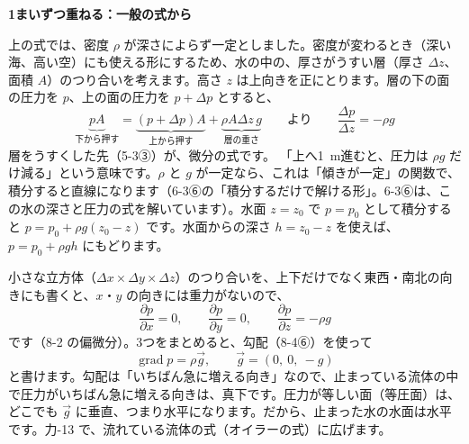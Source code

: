 \noindent\textbf{1まいずつ重ねる：一般の式から}\par\nobreak
上の式では、密度 $\rho$ が深さによらず一定としました。密度が変わるとき（深い海、高い空）にも使える形にするため、水の中の、厚さがうすい層（厚さ $\Delta z$、面積 $A$）のつり合いを考えます。高さ $z$ は上向きを正にとります。層の下の面の圧力を $p$、上の面の圧力を $p+\Delta p$ とすると、
\[ \underbrace{pA}_{\text{下から押す}}=\underbrace{(p+\Delta p)A}_{\text{上から押す}}+\underbrace{\rho A\Delta z\,g}_{\text{層の重さ}}\qquad\text{より}\qquad \frac{\Delta p}{\Delta z}=-\rho g \]
層をうすくした先（5-3③）が、微分の式です。
「上へ\qty{1}{m}進むと、圧力は $\rho g$ だけ減る」という意味です。$\rho$ と $g$ が一定なら、これは「傾きが一定」の関数で、積分すると直線になります（6-3⑥の「積分するだけで解ける形」。6-3⑥は、この水の深さと圧力の式を解いています）。水面 $z=z_0$ で $p=p_0$ として積分すると $p=p_0+\rho g(z_0-z)$ です。水面からの深さ $h=z_0-z$ を使えば、$p=p_0+\rho gh$ にもどります。
\begin{phflow}
\end{phflow}


\begin{motto}[5]
小さな立方体（$\Delta x\times\Delta y\times\Delta z$）のつり合いを、上下だけでなく東西・南北の向きにも書くと、$x$・$y$ の向きには重力がないので、
\[ \dfrac{\partial p}{\partial x}=0,\qquad \dfrac{\partial p}{\partial y}=0,\qquad \dfrac{\partial p}{\partial z}=-\rho g \]
です（8-2 の偏微分）。3つをまとめると、勾配（8-4⑥）を使って
\[ \operatorname{grad}p=\rho\vec{g},\qquad \vec{g}=(0,\ 0,\ -g) \]
と書けます。勾配は「いちばん急に増える向き」なので、止まっている流体の中で圧力がいちばん急に増える向きは、真下です。圧力が等しい面（等圧面）は、どこでも $\vec{g}$ に垂直、つまり水平になります。だから、止まった水の水面は水平です。力-13 で、流れている流体の式（オイラーの式）に広げます。
\end{motto}

